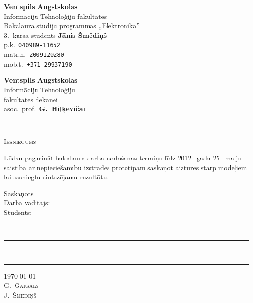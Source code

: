 \documentclass[10pt,a4paper]{article}
\begin{document}
	\sloppy
	\pagestyle{empty}
	\begin{minipage}[t]{0.47\textwidth}
		\begin{flushleft}
			\textbf{Ventspils Augstskolas}\\
			Informāciju Tehnoloģiju fakultātes\\
			Bakalaura studiju programmas „Elektronika”\\
			3.~kursa students \textbf{Jānis Šmēdiņš}\\
			p.k.~\texttt{040989-11652}\\
			matr.n.~\texttt{2009120280}\\
			mob.t.~\texttt{+371 29937190}
		\end{flushleft}
	\end{minipage}
	\begin{minipage}[t]{0.47\textwidth}
		\begin{flushright}
			\textbf{Ventspils Augstskolas}\\
			Informāciju Tehnoloģiju\\
			fakultātes dekānei\\
			asoc.~prof.~\textbf{G.~Hiļķevičai}
		\end{flushright}
	\end{minipage}\\[3em]
	
	\vspace{1cm}
	\begin{center}
		\Large\scshape Iesniegums
	\end{center}
	
	Lūdzu pagarināt bakalaura darba nodošanas termiņu 
	līdz 2012.~gada 25.~maiju saistībā ar 
	nepieciešamību izstrādes prototipam saskaņot aiztures starp modeļiem
	lai sasniegtu sintezējamu rezultātu.
	
	
	\vspace{2cm}
	
	\begin{minipage}[t]{0.32\textwidth}
		\raggedright Saskaņots\\[3ex]
		Darba vadītājs:\\[3ex]
		Students:%
	\end{minipage}
	\begin{minipage}[t]{0.32\textwidth}
		\centering \hfill \\[3ex]
		\color{gray}\rule[-2pt]{10em}{1pt}\\[3ex]
		\color{gray}\rule[-2pt]{10em}{1pt}
	\end{minipage}
	\begin{minipage}[t]{0.32\textwidth}
		\raggedleft \today \\[3ex]
		\scshape 
		G.~Gaigals\\[3ex]
		J.~Šmēdiņš
	\end{minipage}
		
\end{document}
